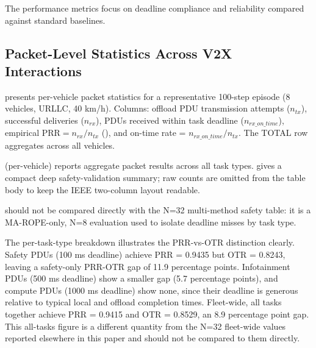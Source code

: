 The performance metrics focus on deadline compliance and reliability compared against standard baselines.

\subsection{Packet-Level Statistics Across V2X Interactions}

 presents per-vehicle packet statistics for a representative 100-step episode (8 vehicles, URLLC, 40 km/h). Columns: offload PDU transmission attempts ($n_{tx}$), successful deliveries ($n_{rx}$), PDUs received within task deadline ($n_{rx\_on\_time}$), empirical $\text{PRR} = n_{rx}/n_{tx}$ (), and on-time rate = $n_{rx\_on\_time}/n_{tx}$. The TOTAL row aggregates across all vehicles.



 (per-vehicle) reports aggregate packet results across all task types.  gives a compact deep safety-validation summary; raw counts are omitted from the table body to keep the IEEE two-column layout readable.



 should not be compared directly with the N=32 multi-method safety table: it is a MA-ROPE-only, N=8 evaluation used to isolate deadline misses by task type.

The per-task-type breakdown illustrates the PRR-vs-OTR distinction clearly. Safety PDUs (100 ms deadline) achieve PRR = 0.9435 but OTR = 0.8243, leaving a safety-only PRR-OTR gap of 11.9 percentage points. Infotainment PDUs (500 ms deadline) show a smaller gap (5.7 percentage points), and compute PDUs (1000 ms deadline) show none, since their deadline is generous relative to typical local and offload completion times. Fleet-wide, all tasks together achieve PRR = 0.9415 and OTR = 0.8529, an 8.9 percentage point gap. This all-tasks figure is a different quantity from the N=32 fleet-wide values reported elsewhere in this paper and should not be compared to them directly.
